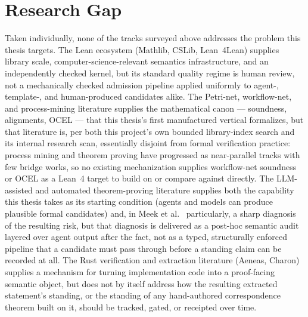 \section{Research Gap}

Taken individually, none of the tracks surveyed above addresses the
problem this thesis targets. The Lean ecosystem (Mathlib, CSLib,
Lean~4Lean) supplies library scale, computer-science-relevant semantics
infrastructure, and an independently checked kernel, but its standard
quality regime is human review, not a mechanically checked admission
pipeline applied uniformly to agent-, template-, and human-produced
candidates alike. The Petri-net, workflow-net, and process-mining
literature supplies the mathematical canon --- soundness, alignments,
OCEL --- that this thesis's first manufactured vertical formalizes, but
that literature is, per both this project's own bounded library-index
search and its internal research scan, essentially disjoint from formal
verification practice: process mining and theorem proving have
progressed as near-parallel tracks with few bridge works, so no existing
mechanization supplies workflow-net soundness or OCEL as a Lean~4 target
to build on or compare against directly. The LLM-assisted and automated
theorem-proving literature supplies both the capability this thesis takes
as its starting condition (agents and models can produce plausible formal
candidates) and, in Meek et al.~\cite{meek2026formalizing} particularly, a
sharp diagnosis of the resulting risk, but that diagnosis is delivered as
a post-hoc semantic audit layered over agent output after the fact, not
as a typed, structurally enforced pipeline that a candidate must pass
through before a standing claim can be recorded at all. The Rust
verification and extraction literature (Aeneas, Charon) supplies a
mechanism for turning implementation code into a proof-facing semantic
object, but does not by itself address how the resulting extracted
statement's standing, or the standing of any hand-authored correspondence
theorem built on it, should be tracked, gated, or receipted over time.


